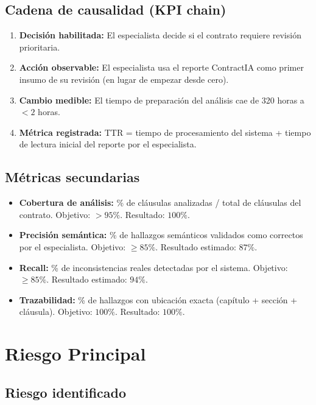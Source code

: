 \subsection{Cadena de causalidad (KPI chain)}

\begin{enumerate}
    \item \textbf{Decisión habilitada:} El especialista decide si el
    contrato requiere revisión prioritaria.
    \item \textbf{Acción observable:} El especialista usa el reporte
    ContractIA como primer insumo de su revisión (en lugar de empezar
    desde cero).
    \item \textbf{Cambio medible:} El tiempo de preparación del análisis
    cae de 320 horas a $<2$ horas.
    \item \textbf{Métrica registrada:} TTR = tiempo de procesamiento del
    sistema + tiempo de lectura inicial del reporte por el especialista.
\end{enumerate}

\subsection{Métricas secundarias}

\begin{itemize}
    \item \textbf{Cobertura de análisis:} \% de cláusulas analizadas /
    total de cláusulas del contrato. Objetivo: $> 95\%$. Resultado: $100\%$.
    \item \textbf{Precisión semántica:} \% de hallazgos semánticos
    validados como correctos por el especialista. Objetivo: $\geq 85\%$.
    Resultado estimado: $87\%$.
    \item \textbf{Recall:} \% de inconsistencias reales detectadas por el
    sistema. Objetivo: $\geq 85\%$. Resultado estimado: $94\%$.
    \item \textbf{Trazabilidad:} \% de hallazgos con ubicación exacta
    (capítulo + sección + cláusula). Objetivo: $100\%$. Resultado: $100\%$.
\end{itemize}

\section{Riesgo Principal}

\subsection{Riesgo identificado}


